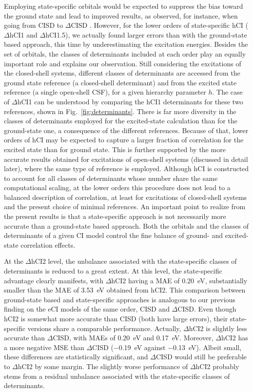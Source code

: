 \documentclass[aip,jcp,reprint,noshowkeys,superscriptaddress]{revtex4-1}
\begin{document}
Employing state-specific orbitals would be expected to suppress the bias toward the ground state and lead to improved results, as observed, for instance, when going from CISD to $\Delta$CISD \cite{Kossoski_2023}.
However, for the lower orders of state-specific hCI ($\Delta$hCI1 and $\Delta$hCI1.5), we actually found larger errors than with the ground-state based approach, this time by underestimating the excitation energies.
Besides the set of orbitals, the classes of determinants included at each order play an equally important role and explains our observation.
Still considering the excitations of the closed-shell systems,
different classes of determinants are accessed from the ground state reference (a closed-shell determinant) and from the excited state reference (a single open-shell CSF),
for a given hierarchy parameter $h$.
The case of $\Delta$hCI1 can be understood by comparing the hCI1 determinants for these two references, shown in Fig.~\ref{fig:determinants}.
There is far more diversity in the classes of determinants employed for the excited-state calculation than for the ground-state one, a consequence of the different references.
Because of that, lower orders of hCI may be expected to capture a larger fraction of correlation for the excited state than for ground state.
This is further supported by the more accurate results obtained for excitations of open-shell systems (discussed in detail later), where the same type of reference is employed.
Although hCI is constructed to account for all classes of determinants whose number share the same computational scaling,
at the lower orders this procedure does not lead to a balanced description of correlation, at least for excitations of closed-shell systems and the present choice of minimal references.
An important point to realize from the present results is that a state-specific approach is not necessarily more accurate than a ground-state based approach.
Both the orbitals and the classes of determinants of a given CI model control the fine balance of ground- and excited-state correlation effects.

At the $\Delta$hCI2 level, the unbalance associated with the state-specific classes of determinants is reduced to a great extent.
At this level, the state-specific advantage clearly manifests, with $\Delta$hCI2 having a MAE of \SI{0.20}{\eV}, substantially smaller than the MAE of \SI{3.53}{\eV} obtained from hCI2.
This comparison between ground-state based and state-specific approaches is analogous to our previous finding on the eCI models of the same order, CISD and $\Delta$CISD. \cite{Kossoski_2023}
Even though hCI2 is somewhat more accurate than CISD (both have large errors), their state-specific versions share a comparable performance.
Actually, $\Delta$hCI2 is slightly less accurate than $\Delta$CISD, with MAEs of \SI{0.20}{\eV} and \SI{0.17}{\eV}.
Moreover, $\Delta$hCI2 has a more negative MSE than $\Delta$CISD (\SI{-0.19}{\eV} against \SI{-0.13}{\eV}).
Albeit small, these differences are statistically significant, and $\Delta$CISD would still be preferable to $\Delta$hCI2 by some margin.
The slightly worse performance of $\Delta$hCI2 probably stems from a residual unbalance associated with the state-specific classes of determinants.
\end{document}
